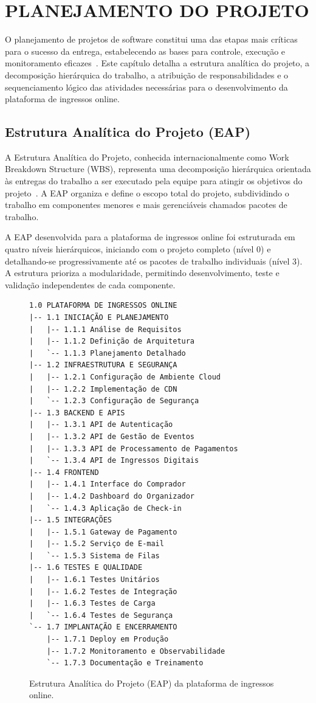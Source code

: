 \chapter{PLANEJAMENTO DO PROJETO}

O planejamento de projetos de software constitui uma das etapas mais críticas para o sucesso da entrega, estabelecendo as bases para controle, execução e monitoramento eficazes~\cite{PMI:2021}. Este capítulo detalha a estrutura analítica do projeto, a decomposição hierárquica do trabalho, a atribuição de responsabilidades e o sequenciamento lógico das atividades necessárias para o desenvolvimento da plataforma de ingressos online.

\section{Estrutura Analítica do Projeto (EAP)}

A Estrutura Analítica do Projeto, conhecida internacionalmente como Work Breakdown Structure (WBS), representa uma decomposição hierárquica orientada às entregas do trabalho a ser executado pela equipe para atingir os objetivos do projeto~\cite{PMI:2021}. A EAP organiza e define o escopo total do projeto, subdividindo o trabalho em componentes menores e mais gerenciáveis chamados pacotes de trabalho.

A EAP desenvolvida para a plataforma de ingressos online foi estruturada em quatro níveis hierárquicos, iniciando com o projeto completo (nível 0) e detalhando-se progressivamente até os pacotes de trabalho individuais (nível 3). A estrutura prioriza a modularidade, permitindo desenvolvimento, teste e validação independentes de cada componente.

\begin{figure}[H]
\centering
\small
\begin{verbatim}
1.0 PLATAFORMA DE INGRESSOS ONLINE
|-- 1.1 INICIAÇÃO E PLANEJAMENTO
|   |-- 1.1.1 Análise de Requisitos
|   |-- 1.1.2 Definição de Arquitetura
|   `-- 1.1.3 Planejamento Detalhado
|-- 1.2 INFRAESTRUTURA E SEGURANÇA
|   |-- 1.2.1 Configuração de Ambiente Cloud
|   |-- 1.2.2 Implementação de CDN
|   `-- 1.2.3 Configuração de Segurança
|-- 1.3 BACKEND E APIS
|   |-- 1.3.1 API de Autenticação
|   |-- 1.3.2 API de Gestão de Eventos
|   |-- 1.3.3 API de Processamento de Pagamentos
|   `-- 1.3.4 API de Ingressos Digitais
|-- 1.4 FRONTEND
|   |-- 1.4.1 Interface do Comprador
|   |-- 1.4.2 Dashboard do Organizador
|   `-- 1.4.3 Aplicação de Check-in
|-- 1.5 INTEGRAÇÕES
|   |-- 1.5.1 Gateway de Pagamento
|   |-- 1.5.2 Serviço de E-mail
|   `-- 1.5.3 Sistema de Filas
|-- 1.6 TESTES E QUALIDADE
|   |-- 1.6.1 Testes Unitários
|   |-- 1.6.2 Testes de Integração
|   |-- 1.6.3 Testes de Carga
|   `-- 1.6.4 Testes de Segurança
`-- 1.7 IMPLANTAÇÃO E ENCERRAMENTO
    |-- 1.7.1 Deploy em Produção
    |-- 1.7.2 Monitoramento e Observabilidade
    `-- 1.7.3 Documentação e Treinamento
\end{verbatim}
\caption{Estrutura Analítica do Projeto (EAP) da plataforma de ingressos online.}%
\label{fig:eap}
\end{figure}

